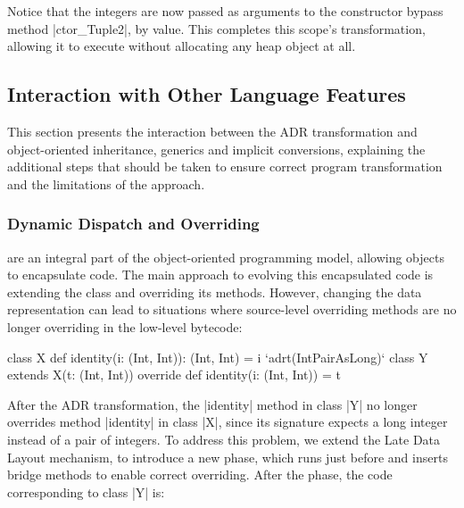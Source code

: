 Notice that the integers are now passed as arguments to the constructor bypass method |ctor_Tuple2|, by value. This completes this scope's transformation, allowing it to execute without allocating any heap object at all.




\subsection{Interaction with Other Language Features}
\label{sec:ildl:language-features}

This section presents the interaction between the ADR transformation and object-oriented inheritance, generics and implicit conversions, explaining the additional steps that should be taken to ensure correct program transformation and  the limitations of the approach.

\subsubsection{Dynamic Dispatch and Overriding}
\label{sec:ildl:language-overriding}
are an integral part of the object-oriented programming model, allowing objects to encapsulate code. The main approach to evolving this encapsulated code is extending the class and overriding its methods. However, changing the data representation can lead to situations where source-level overriding methods are no longer overriding in the low-level bytecode:

\begin{lstlisting-nobreak}
class X {
  def identity(i: (Int, Int)): (Int, Int) = i
}
`adrt(IntPairAsLong)` {
  class Y extends X(t: (Int, Int)) {
    override def identity(i: (Int, Int)) = t
  }
}
\end{lstlisting-nobreak}

After the ADR transformation, the |identity| method in class |Y| no longer overrides method |identity| in class |X|, since its signature expects a long integer instead of a pair of integers. To address this problem, we extend the Late Data Layout mechanism, to introduce a new \bridge{} phase, which runs just before \coerce{} and inserts bridge methods to enable correct overriding. After the \inject{} phase, the code corresponding to class |Y| is:

